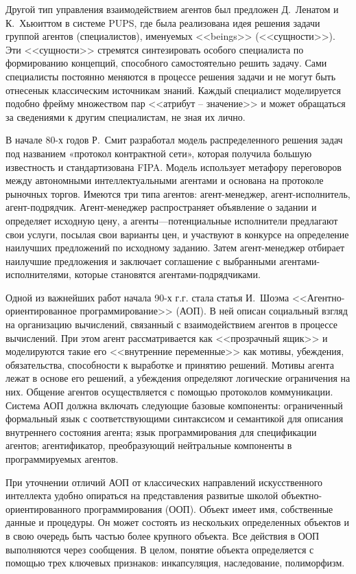 Другой тип управления взаимодействием агентов был предложен Д.~Ленатом и К.~Хьюиттом в системе PUPS, где была реализована идея решения задачи группой агентов (специалистов), именуемых <<beings>> (<<сущности>>). Эти <<сущности>> стремятся синтезировать особого специалиста по формированию концепций, способного самостоятельно решить задачу. Сами специалисты постоянно меняются в процессе решения задачи и не могут быть отнесенык классическим источникам знаний. Каждый специалист моделируется подобно фрейму множеством пар <<атрибут -- значение>> и может обращаться за сведениями к другим специалистам, не зная их лично.

В начале 80-х годов Р.~Смит разработал модель распределенного решения задач под названием «протокол контрактной сети», которая получила большую известность и стандартизована FIPA. Модель использует метафору переговоров между автономными интеллектуальными агентами и основана на протоколе рыночных торгов. Имеются три типа агентов: агент-менеджер, агент-исполнитель, агент-подрядчик. Агент-менеджер распространяет объявление о задании и определяет исходную цену, а агенты—потенциальные исполнители предлагают свои услуги, посылая свои варианты цен, и участвуют в конкурсе на определение наилучших предложений по исходному заданию. Затем агент-менеджер отбирает наилучшие предложения и заключает соглашение с выбранными агентами-исполнителями, которые становятся агентами-подрядчиками.

Одной из важнейших работ начала 90-х г.г. стала статья И.~Шоэма <<Агентно-ориентированное программирование>> (АОП). В ней описан социальный взгляд на организацию вычислений, связанный с взаимодействием агентов в процессе вычислений. При этом агент рассматривается как <<прозрачный ящик>> и моделируются такие его <<внутренние переменные>> как мотивы, убеждения, обязательства, способности к выработке и принятию решений. Мотивы агента лежат в основе его решений, а убеждения определяют логические ограничения на них. Общение агентов осуществляется с помощью протоколов коммуникации.
Система АОП должна включать следующие базовые компоненты: ограниченный формальный язык с соответствующими синтаксисом и семантикой для описания внутреннего состояния агента; язык программирования для спецификации агентов; агентификатор, преобразующий нейтральные компоненты в программируемых агентов.

При уточнении отличий АОП от классических направлений искусственного интеллекта удобно опираться на представления развитые школой объектно-ориентированного программирования (ООП). Объект имеет имя, собственные данные и процедуры. Он может состоять из нескольких определенных объектов и в свою очередь быть частью более крупного объекта. Все действия в ООП выполняются через сообщения. В целом, понятие объекта определяется с помощью трех ключевых признаков: инкапсуляция, наследование, полиморфизм.

